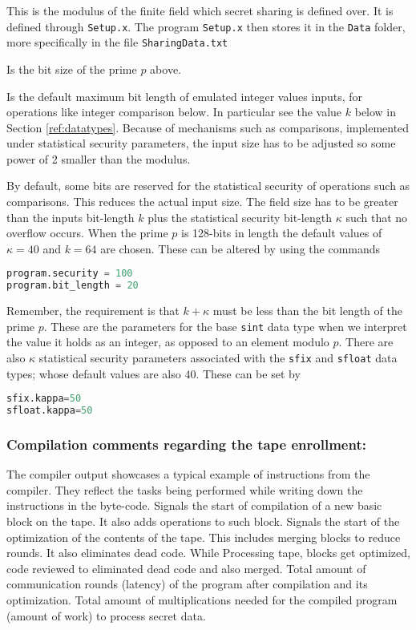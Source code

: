 This is the modulus of the finite field which secret sharing is defined over.
It is defined through \verb|Setup.x|.
The program \verb+Setup.x+ then stores it in the \verb|Data| folder, more specifically in the file \verb|SharingData.txt|

Is the bit size of the prime $p$ above.

Is the default maximum bit length of emulated integer values inputs,
for operations like integer comparison below.
In particular see the value $k$ below in Section \ref{ref:datatypes}.
Because of mechanisms such as comparisons, implemented under statistical security parameters, the input size has to be adjusted so
some power of 2 smaller than the modulus.

By default, some bits are reserved for the statistical security of operations such as comparisons. This reduces the actual input size.
The field size has to be greater than the inputs bit-length $k$ plus the statistical security bit-length $\kappa$ such that no overflow occurs.
When the prime $p$ is 128-bits in length the default values of $\kappa=40$ and $k=64$ are chosen.
These can be altered by using the commands
\begin{lstlisting}[language={python}]
program.security = 100
program.bit_length = 20
\end{lstlisting}
Remember, the requirement is that $k+\kappa$ must be less than the bit length of the prime $p$.
These are the parameters for the base \verb+sint+ data type when we interpret the value it holds
as an integer, as opposed to an element modulo $p$.
There are also $\kappa$ statistical security parameters associated with the \verb+sfix+ and \verb+sfloat+ data types;
whose default values are also $40$.
These can be set by
\begin{lstlisting}[language={python}]
sfix.kappa=50
sfloat.kappa=50
\end{lstlisting}


\subsubsection{Compilation comments regarding the tape enrollment:}
The compiler output showcases a typical example of instructions from the compiler. They reflect the tasks being performed while writing down the instructions in the byte-code.
Signals the start of compilation of a new basic block on the tape. It also adds operations to such block.
Signals the start of the optimization of the contents of the tape. This includes merging blocks to reduce rounds. It also eliminates dead code.
While Processing tape, blocks get optimized, code reviewed to eliminated dead code and also merged.
Total amount of communication rounds (latency) of the program after compilation and its optimization.
Total amount of multiplications needed for the compiled program (amount of work) to process secret data.

